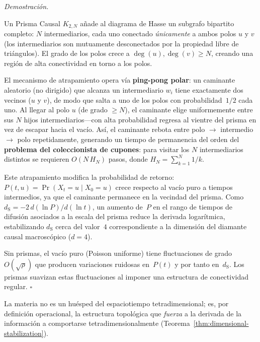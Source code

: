 \documentclass[11pt, a4paper, openany]{book}
\newcommand{\dS}{d_{\mathrm{S}}}
\renewenvironment{proof}[1][Demostraci\'on]{%
  \par\noindent\textit{#1.}\quad
}{\hfill$\square$\par\medskip}
\begin{document}
\begin{proof}
Un Prisma Causal $K_{2,N}$ a\~nade al diagrama de Hasse un subgrafo
bipartito completo: $N$ intermediarios, cada uno conectado
\emph{\'unicamente} a ambos polos $u$ y $v$ (los intermediarios son
mutuamente desconectados por la propiedad libre de tri\'angulos). El
grado de los polos crece a $\deg(u), \deg(v) \geq N$, creando una
regi\'on de alta conectividad en torno a los polos.

El mecanismo de atrapamiento opera v\'ia \textbf{ping-pong polar}:
un caminante aleatorio (no dirigido) que alcanza un intermediario
$w_i$ tiene exactamente dos vecinos ($u$ y $v$), de modo que salta a
uno de los polos con probabilidad~$1/2$ cada uno. Al llegar al polo
$u$ (de grado $\geq N$), el caminante elige uniformemente entre sus
$N$ hijos intermediarios---con alta probabilidad regresa al vientre
del prisma en vez de escapar hacia el vac\'io. As\'i, el caminante
rebota entre polo $\to$ intermedio $\to$ polo repetidamente,
generando un tiempo de permanencia del orden del \textbf{problema
del coleccionista de cupones}: para visitar los $N$ intermediarios
distintos se requieren $O(N\,H_N)$ pasos, donde $H_N =
\sum_{k=1}^{N} 1/k$.

Este atrapamiento modifica la probabilidad de retorno:
$P(t,u) = \Pr(X_t = u \mid X_0 = u)$ crece respecto al vac\'io puro
a tiempos intermedios, ya que el caminante permanece en la vecindad
del prisma. Como $\dS = -2\,d(\ln P)/d(\ln t)$, un aumento de~$P$
en el rango de tiempos de difusi\'on asociados a la escala del prisma
reduce la derivada logar\'itmica, estabilizando $\dS$ cerca del
valor~$4$ correspondiente a la dimensi\'on del diamante causal
macrosc\'opico ($d = 4$).

Sin prismas, el vac\'io puro (Poisson uniforme) tiene fluctuaciones
de grado $O(\sqrt{\rho})$ que producen variaciones ruidosas en~$P(t)$
y por tanto en~$\dS$. Los prismas suavizan estas fluctuaciones al
imponer una estructura de conectividad regular.
\end{proof}

\begin{result}[title={Estabilizaci\'on Dimensional por la Materia}]
\label{res:dimensional-stabilization}
La materia no es un hu\'esped del espaciotiempo tetradimensional; es,
por definici\'on operacional, la estructura topol\'ogica que
\emph{fuerza} a la derivada de la informaci\'on a comportarse
tetradimensionalmente
(Teorema~\ref{thm:dimensional-stabilization}).
\end{result}
\end{document}
